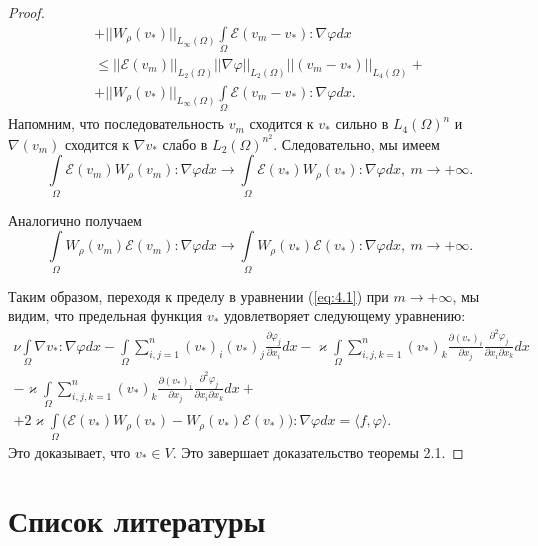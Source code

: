 \begin{proof}
\begin{equation*}
\begin{gathered}
            + ||W_\rho(v_*)||_{L_\infty(\Omega)} \int\limits_{\Omega}\mathcal{E}(v_m - v_*): \nabla\varphi dx\\
            \leq ||\mathcal{E}(v_m)||_{L_2(\Omega)}||\nabla\varphi||_{L_2(\Omega)}||(v_m - v_*)||_{L_4(\Omega)} +\\
            + ||W_\rho(v_*)||_{L_\infty(\Omega)} \int\limits_{\Omega}\mathcal{E}(v_m - v_*): \nabla\varphi dx.
        \end{gathered}
    \end{equation*}
    Напомним, что последовательность $v_m$ сходится к $v_*$ сильно в $L_4(\Omega)^n$
    и $\nabla(v_m)$ сходится к $\nabla v_*$ слабо в $L_2(\Omega)^{n^2}$.
    Следовательно, мы имеем
    $$\int\limits_{\Omega}\mathcal{E}(v_m) W_\rho(v_m): \nabla\varphi dx \rightarrow
    \int\limits_{\Omega}\mathcal{E}(v_*) W_\rho(v_*): \nabla\varphi dx, \ m \rightarrow +\infty.$$

    Аналогично получаем
    $$\int\limits_{\Omega}W_\rho(v_m)\mathcal{E}(v_m): \nabla\varphi dx \rightarrow
    \int\limits_{\Omega}W_\rho(v_*)\mathcal{E}(v_*): \nabla\varphi dx, \ m \rightarrow +\infty.$$

    Таким образом, переходя к пределу в уравнении (\ref{eq:4.1}) при $m \rightarrow +\infty$,
    мы видим, что предельная функция $v_*$ удовлетворяет следующему уравнению:
    \begin{equation*}
        \begin{gathered}
            \nu\int\limits_{\Omega}\nabla v_*: \nabla\varphi dx -
            \int\limits_{\Omega}\sum_{i,j=1}^n (v_*)_i (v_*)_j \frac{\partial \varphi_j}{\partial x_i} dx
            - \varkappa \int\limits_{\Omega}\sum_{i,j,k=1}^n (v_*)_k \frac{\partial (v_*)_i}{\partial x_j}
            \frac{\partial^2 \varphi_j}{\partial x_i \partial x_k} dx \\
            - \varkappa \int\limits_{\Omega}\sum_{i,j,k=1}^n (v_*)_k \frac{\partial (v_*)_i}{\partial x_j}
            \frac{\partial^2 \varphi_j}{\partial x_i \partial x_k} dx + \\ + 2 \varkappa
            \int\limits_{\Omega}\bigg(\mathcal{E}(v_*) W_\rho(v_*) - W_\rho(v_*)\mathcal{E}(v_*)\bigg): \nabla\varphi dx = \langle f, \varphi \rangle.
        \end{gathered}
    \end{equation*}
    Это доказывает, что $v_* \in V$. Это завершает доказательство теоремы 2.1.
\end{proof}

\section{Список литературы}

